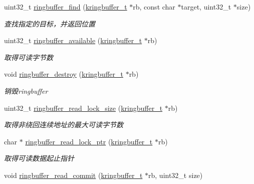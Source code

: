 \begin{DoxyCompactItemize}
uint32\+\_\+t \hyperlink{a00107_a477c3142a4a35f33cfb92bf0b984fd71_a477c3142a4a35f33cfb92bf0b984fd71}{ringbuffer\+\_\+find} (\hyperlink{a00066_a66d91f7667db1f0b2983fc25e1a20f1c_a66d91f7667db1f0b2983fc25e1a20f1c}{kringbuffer\+\_\+t} $\ast$rb, const char $\ast$target, uint32\+\_\+t $\ast$size)
\begin{DoxyCompactList}\small\item\em 查找指定的目标，并返回位置 \end{DoxyCompactList}\item 
uint32\+\_\+t \hyperlink{a00107_aecd5c166ce42982ee434172cc555787d_aecd5c166ce42982ee434172cc555787d}{ringbuffer\+\_\+available} (\hyperlink{a00066_a66d91f7667db1f0b2983fc25e1a20f1c_a66d91f7667db1f0b2983fc25e1a20f1c}{kringbuffer\+\_\+t} $\ast$rb)
\begin{DoxyCompactList}\small\item\em 取得可读字节数 \end{DoxyCompactList}\item 
void \hyperlink{a00107_aa6135df0cc9bc827cae301626898dace_aa6135df0cc9bc827cae301626898dace}{ringbuffer\+\_\+destroy} (\hyperlink{a00066_a66d91f7667db1f0b2983fc25e1a20f1c_a66d91f7667db1f0b2983fc25e1a20f1c}{kringbuffer\+\_\+t} $\ast$rb)
\begin{DoxyCompactList}\small\item\em 销毁ringbuffer \end{DoxyCompactList}\item 
uint32\+\_\+t \hyperlink{a00107_a4bd33ec2ce3cba490a6166c5eac88f5c_a4bd33ec2ce3cba490a6166c5eac88f5c}{ringbuffer\+\_\+read\+\_\+lock\+\_\+size} (\hyperlink{a00066_a66d91f7667db1f0b2983fc25e1a20f1c_a66d91f7667db1f0b2983fc25e1a20f1c}{kringbuffer\+\_\+t} $\ast$rb)
\begin{DoxyCompactList}\small\item\em 取得非绕回连续地址的最大可读字节数 \end{DoxyCompactList}\item 
char $\ast$ \hyperlink{a00107_a51fd16b89396cbe6a3e4cf3d41b4dda5_a51fd16b89396cbe6a3e4cf3d41b4dda5}{ringbuffer\+\_\+read\+\_\+lock\+\_\+ptr} (\hyperlink{a00066_a66d91f7667db1f0b2983fc25e1a20f1c_a66d91f7667db1f0b2983fc25e1a20f1c}{kringbuffer\+\_\+t} $\ast$rb)
\begin{DoxyCompactList}\small\item\em 取得可读数据起止指针 \end{DoxyCompactList}\item 
void \hyperlink{a00107_a5d0caeccb61acafaa4c5148b697dd927_a5d0caeccb61acafaa4c5148b697dd927}{ringbuffer\+\_\+read\+\_\+commit} (\hyperlink{a00066_a66d91f7667db1f0b2983fc25e1a20f1c_a66d91f7667db1f0b2983fc25e1a20f1c}{kringbuffer\+\_\+t} $\ast$rb, uint32\+\_\+t size)

\end{DoxyCompactItemize}
